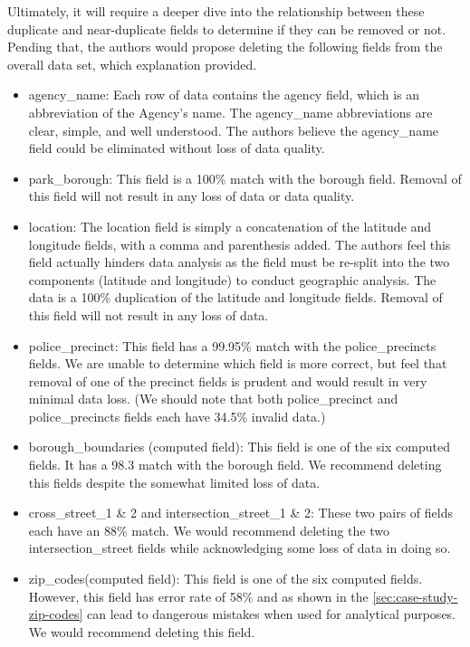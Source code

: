 \documentclass[12pt, titlepage]{article}
\begin{document}
Ultimately, it will require a deeper dive into the relationship 
between these duplicate and near-duplicate fields to determine 
if they can be removed or not. Pending that, the authors would propose 
deleting the following fields from the overall data set, 
which explanation provided.
 
\begin{itemize}
	\item agency\_name: Each row of data contains the agency field, 
	which is an abbreviation of the Agency's name. The agency\_name 
	abbreviations are clear, simple, and well understood. The 
	authors believe the agency\_name field could be eliminated 
	without loss of data quality. 
		    
	\item park\_borough:  This field is a 100\% match with the 
	borough field. Removal of this field will not result in any loss of 
	data or data quality.
		    
	\item location:  The location field is simply a concatenation of 
	the latitude and longitude fields, with a comma and parenthesis 
	added. The authors feel this field actually hinders data analysis 
	as the field must be re-split into the two components 
	(latitude and longitude) to conduct geographic analysis. The data is 
	a 100\% duplication of the latitude and longitude fields. Removal 
	of this field will not result in any loss of data.
		    
	\item police\_precinct: This field has a 99.95\% match with the 
	police\_precincts fields. We are unable to determine which field 
	is more correct, but feel that removal of one of the precinct fields 
	is prudent and would result in very minimal data loss. (We 
	should note that both police\_precinct and police\_precincts 
	fields each have 34.5\% invalid data.)
		   
	\item borough\_boundaries (computed field): This field is one of 
	the six computed fields. It has a 98.3 match with the borough 
	field. We recommend deleting this fields despite the somewhat 
	limited loss of data. 
		    
	\item cross\_street\_1 \& 2 and intersection\_street\_1 \& 2: These 
	two pairs of fields each have an 88\% match. We would recommend 
	deleting the two intersection\_street fields while acknowledging 
	some loss of data in doing so.
		     
	\item zip\_codes(computed field):  This field is one of the six 
	computed fields.  However, this field has error rate of 58\% and 
	as shown in the \ref{sec:case-study-zip-codes} can lead to 
	dangerous mistakes when used for analytical purposes. We would 
	recommend deleting this field.
\end{itemize}
 	
\end{document}
